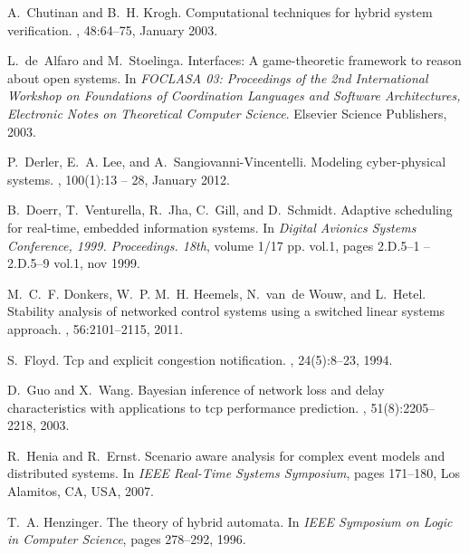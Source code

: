 \documentclass{sig-alternate-ipsn09}
\begin{document}
\begin{thebibliography}{10}
A.~Chutinan and B.~H. Krogh.
\newblock Computational techniques for hybrid system verification.
, 48:64--75, January
  2003.

L.~de~Alfaro and M.~Stoelinga.
\newblock Interfaces: A game-theoretic framework to reason about open systems.
\newblock In {\em FOCLASA 03: Proceedings of the 2nd International Workshop on
  Foundations of Coordination Languages and Software Architectures, Electronic
  Notes on Theoretical Computer Science}. Elsevier Science Publishers, 2003.

P.~Derler, E.~A. Lee, and A.~Sangiovanni-Vincentelli.
\newblock Modeling cyber-physical systems.
, 100(1):13 --
  28, January 2012.

B.~Doerr, T.~Venturella, R.~Jha, C.~Gill, and D.~Schmidt.
\newblock Adaptive scheduling for real-time, embedded information systems.
\newblock In {\em Digital Avionics Systems Conference, 1999. Proceedings.
  18th}, volume 1/17 pp. vol.1, pages 2.D.5--1 --2.D.5--9 vol.1, nov 1999.

M.~C.~F. Donkers, W.~P. M.~H. Heemels, N.~van~de Wouw, and L.~Hetel.
\newblock Stability analysis of networked control systems using a switched
  linear systems approach.
, 56:2101--2115, 2011.

S.~Floyd.
\newblock Tcp and explicit congestion notification.
, 24(5):8--23, 1994.

D.~Guo and X.~Wang.
\newblock Bayesian inference of network loss and delay characteristics with
  applications to tcp performance prediction.
, 51(8):2205--2218,
  2003.

R.~Henia and R.~Ernst.
\newblock Scenario aware analysis for complex event models and distributed
  systems.
\newblock In {\em IEEE Real-Time Systems Symposium}, pages 171--180, Los
  Alamitos, CA, USA, 2007.

T.~A. Henzinger.
\newblock The theory of hybrid automata.
\newblock In {\em IEEE Symposium on Logic in Computer Science}, pages 278--292,
  1996.


\end{thebibliography}
\end{document}
